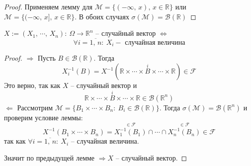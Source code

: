 \begin{proof}
	Применяем лемму для $\mathcal{M} = \{(-\infty,\,x),\, x \in \mathbb{R}\}$ или $\mathcal{M} = \{(-\infty,\,x],\, x \in \mathbb{R}\}$. В обоих случаях $\sigma(\mathcal{M}) = \mathcal{B}(\mathbb{R})$
\end{proof}

\begin{corollary}
	$X := (X_1,\,\cdots,\,X_n):\: \Omega \to \mathbb{R}^n$ -- случайный вектор $\Leftrightarrow$
	\[\forall i = \overline{1,\,n}:\: X_i - \text{ случайная величина}\]
\end{corollary}

\begin{proof}
	$\Rightarrow$ Пусть $B \in \mathcal{B}(\mathbb{R})$. Тогда
	\[X_i^{-1}(B) = X^{-1}(\mathbb{R} \times\cdots\times \stackrel{i}{B}\times\cdots\times\mathbb{R}) \in \mathcal{F}\]
	Это верно, так как $X$ -- случайный вектор и
	\[\mathbb{R} \times\cdots\times \stackrel{i}{B}\times\cdots\times \mathbb{R} \in \mathcal{B}(\mathbb{R}^n)\]
	$\Leftarrow$ Рассмотрим $\mathcal{M} = \{B_1\times\cdots\times B_n :\: B_i \in \mathcal{B}(\mathbb{R})\}$. Тогда $\sigma(\mathcal{M}) = \mathcal{B}(\mathbb{R}^n)$ и проверим условие леммы:
	\[X^{-1}(B_1\times\cdots\times B_n) = \stackrel{\in \mathcal{F}}{X^{-1}_1(B_1)} \cap\cdots\cap \stackrel{\in \mathcal{F}}{X_n^{-1}(B_n)} \in \mathcal{F}\]
	так как $\forall i = \overline{1,\,n}:\: X_i$ -- случайная величина.

	Значит по предыдущей лемме $\Rightarrow X$ -- случайный вектор.
\end{proof}
